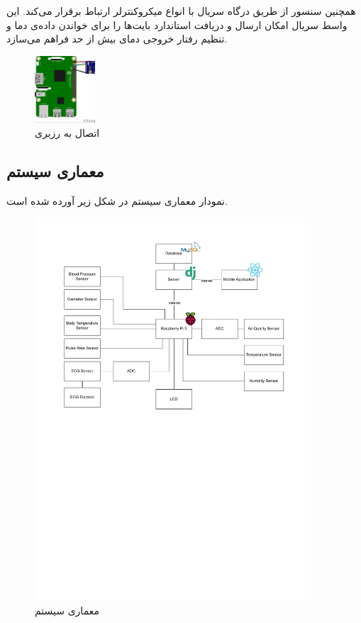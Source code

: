 \documentclass[12pt]{article}
\begin{document}
همچنین سنسور
از طریق درگاه سریال
با انواع میکروکنترلر ارتباط برقرار می‌کند. این واسط سریال امکان ارسال و دریافت استاندارد بایت‌ها را برای خواندن داده‌ی دما و تنظیم رفتار خروجی دمای بیش از حد فراهم می‌‌سازد.

\begin{figure}[h]
	\begin{center}
		\includegraphics[width=0.2\textwidth]{max30102-raspberry}
	\end{center}
	\caption{اتصال  به رزبری}
\end{figure}


\newpage
\subsection{معماری سیستم}

نمودار معماری سیستم در شکل زیر آورده شده است.


\begin{figure}[h]
	\begin{center}
		\includegraphics[width=0.9\textwidth,trim={0 10cm 0 0},clip]{drawio}
	\end{center}
	\caption{معماری سیستم}
\end{figure}
\newpage
\end{document}
